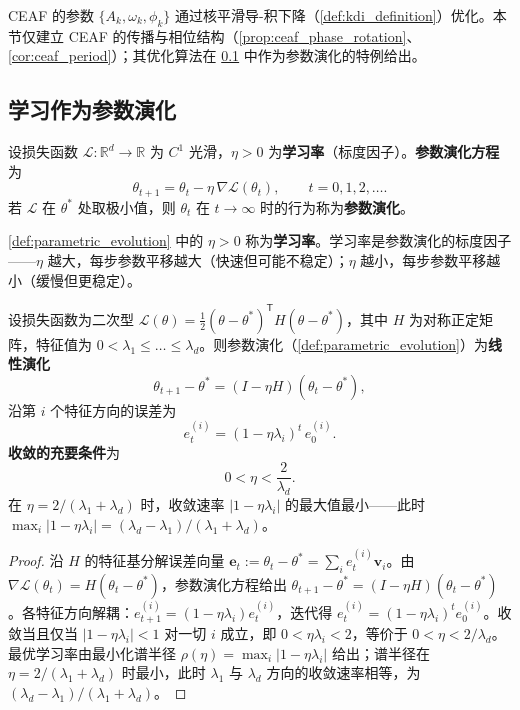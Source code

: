 \begin{remark}\label{rem:ceaf_kdi_interface}
CEAF 的参数 $\{A_k,\omega_k,\phi_k\}$ 通过核平滑导-积下降（\cref{def:kdi_definition}）优化。本节仅建立 CEAF 的传播与相位结构（\cref{prop:ceaf_phase_rotation}、\cref{cor:ceaf_period}）；其优化算法在 \cref{subsec:parametric_evolution} 中作为参数演化的特例给出。
\end{remark}

\subsection{学习作为参数演化}\label{subsec:parametric_evolution}

\begin{definition}[参数演化方程]\label{def:parametric_evolution}
设损失函数 $\mathcal{L}:\mathbb{R}^d\to\mathbb{R}$ 为 $C^1$ 光滑，$\eta>0$ 为\textbf{学习率}（标度因子）。\textbf{参数演化方程}为
\[
\theta_{t+1} = \theta_t - \eta\,\nabla\mathcal{L}(\theta_t), \qquad t = 0,1,2,\dots.
\]
若 $\mathcal{L}$ 在 $\theta^*$ 处取极小值，则 $\theta_t$ 在 $t\to\infty$ 时的行为称为\textbf{参数演化}。
\end{definition}

\begin{definition}[学习率]\label{def:learning_rate}
\cref{def:parametric_evolution} 中的 $\eta>0$ 称为\textbf{学习率}。学习率是参数演化的标度因子——$\eta$ 越大，每步参数平移越大（快速但可能不稳定）；$\eta$ 越小，每步参数平移越小（缓慢但更稳定）。
\end{definition}

\begin{theorem}[二次损失下的线性演化与收敛条件]\label{thm:parametric_evolution_convergence}
设损失函数为二次型 $\mathcal{L}(\theta) = \frac{1}{2}(\theta-\theta^*)^{\mathsf T}H(\theta-\theta^*)$，其中 $H$ 为对称正定矩阵，特征值为 $0 < \lambda_1\le\dots\le\lambda_d$。则参数演化（\cref{def:parametric_evolution}）为\textbf{线性演化}
\[
\theta_{t+1} - \theta^* = (I - \eta H)(\theta_t - \theta^*),
\]
沿第 $i$ 个特征方向的误差为
\[
e_t^{(i)} = (1-\eta\lambda_i)^t\,e_0^{(i)}.
\]
\textbf{收敛的充要条件}为
\[
0 < \eta < \frac{2}{\lambda_d}.
\]
在 $\eta = 2/(\lambda_1+\lambda_d)$ 时，收敛速率 $|1-\eta\lambda_i|$ 的最大值最小——此时 $\max_i|1-\eta\lambda_i| = (\lambda_d-\lambda_1)/(\lambda_1+\lambda_d)$。
\end{theorem}

\begin{proof}
沿 $H$ 的特征基分解误差向量 $\mathbf{e}_t := \theta_t - \theta^* = \sum_i e_t^{(i)}\mathbf{v}_i$。由 $\nabla\mathcal{L}(\theta_t) = H(\theta_t-\theta^*)$，参数演化方程给出 $\theta_{t+1}-\theta^* = (I-\eta H)(\theta_t-\theta^*)$。各特征方向解耦：$e_{t+1}^{(i)} = (1-\eta\lambda_i)e_t^{(i)}$，迭代得 $e_t^{(i)} = (1-\eta\lambda_i)^t e_0^{(i)}$。收敛当且仅当 $|1-\eta\lambda_i|<1$ 对一切 $i$ 成立，即 $0<\eta\lambda_i<2$，等价于 $0<\eta<2/\lambda_d$。最优学习率由最小化谱半径 $\rho(\eta) = \max_i|1-\eta\lambda_i|$ 给出；谱半径在 $\eta = 2/(\lambda_1+\lambda_d)$ 时最小，此时 $\lambda_1$ 与 $\lambda_d$ 方向的收敛速率相等，为 $(\lambda_d-\lambda_1)/(\lambda_1+\lambda_d)$。
\end{proof}

